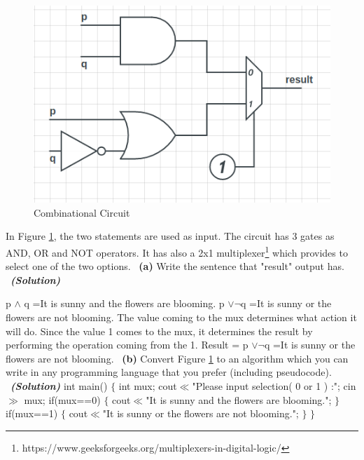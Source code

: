 \documentclass[a4 paper]{article}
\numberwithin{equation}{section}
\newcommand{\subproblem}[1]{~\newline\textbf{(#1)}}
\newcommand{\solution}{~\newline\textbf{\textit{(Solution)}} }
\newcommand{\0}{\mathbf{0}}
\begin{document}
\begin{figure}[htp]
	\centering
	\includegraphics[scale=0.5]{circuit.png}
	\caption{Combinational Circuit}
	\label{fig: circuit}
	
\end{figure}

In Figure \ref{fig: circuit}, the two statements are used as input. The circuit has 3 gates as AND, OR and NOT operators. It has also a 2x1 multiplexer\footnote{https://www.geeksforgeeks.org/multiplexers-in-digital-logic/} which provides to select one of the two options. 
\subproblem{a} Write the sentence that "result" output has.
\solution

\newline  p $\wedge$ q =It is sunny and the flowers are blooming. 
\newline p $\vee \neg$q =It is sunny or the flowers are not blooming.
\newline The value coming to the mux determines what action it will do. Since the value 1 comes to the mux, it determines the result by performing the operation coming from the 1.
\newline Result = p $\vee \neg$q =It is sunny or the flowers are not blooming.
\subproblem{b} Convert Figure \ref{fig: circuit} to an algorithm which you can write in any programming language that you prefer (including pseudocode).
\solution
\newline int main()
\newline $\{$
\newline   int mux;
\newline    cout$\ll$"Please input selection( 0 or 1 ) :";
\newline    cin $\gg$ mux;
\newline    if(mux==0)
\newline    $\{$
\newline        cout$\ll$"It is sunny and the flowers are blooming.";
\newline    $\}$
\newline    if(mux==1)
\newline    $\{$
\newline        cout$\ll$"It is sunny or the flowers are not blooming.";
\newline    $\}$
\newline $\}$
\end{document}
